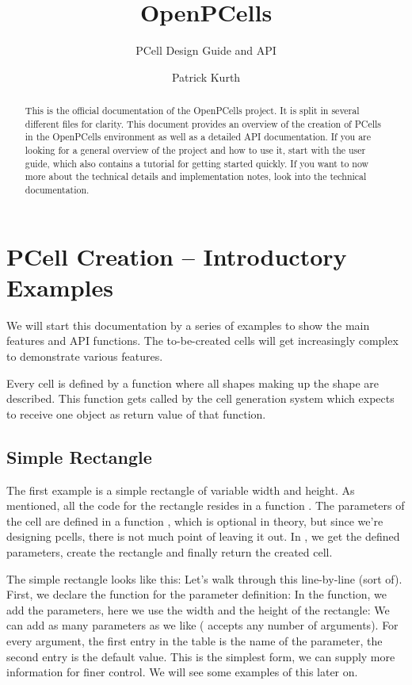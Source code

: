 

\title{OpenPCells}
\subtitle{PCell Design Guide and API}
\author{Patrick Kurth}


\maketitle
\begin{abstract}
    \noindent This is the official documentation of the OpenPCells project.  It is split in several different files for clarity. This document provides an overview
    of the creation of PCells in the OpenPCells environment as well as a detailed API documentation.  If you are looking for a general overview of the project and
    how to use it, start with the user guide, which also contains a tutorial for getting started quickly. If you want to now more about the technical details and
    implementation notes, look into the technical documentation.
\end{abstract}

\tableofcontents

\section{PCell Creation -- Introductory Examples}
We will start this documentation by a series of examples to show the main features and API functions. The to-be-created cells will get increasingly complex to
demonstrate various features.

Every cell is defined by a function where all shapes making up the shape are described. This function gets called by the cell generation system which expects to
receive one object as return value of that function.

\subsection{Simple Rectangle}
The first example is a simple rectangle of variable width and height. As mentioned, all the code for the rectangle resides in a function .
The parameters of the cell are defined in a function , which is optional in theory, but since we're designing pcells, there is not much point
of leaving it out. In , we get the defined parameters, create the rectangle and finally return the created cell.

The simple rectangle looks like this:
Let's walk through this line-by-line (sort of). First, we declare the function for the parameter definition:
In the function, we add the parameters, here we use the width and the height of the rectangle:
We can add as many parameters as we like ( accepts any number of arguments). For every argument, the first entry in the table is
the name of the parameter, the second entry is the default value. This is the simplest form, we can supply more information for finer control. We will see some
examples of this later on.

